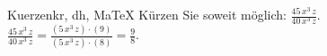 \begin{MAufgabe}{Kuerzen}{kr, dh, MaTeX}
K\"urzen Sie soweit m\"oglich: $\frac{45\, x^3\, z}{40\, x^3\, z}$.\\ 
\ifLsg\MLoesung
\quad $\frac{45\, x^3\, z}{40\, x^3\, z}=\frac{(5\, x^3\, z)\cdot(9)}{(5\, x^3\, z)\cdot(8)}=\frac{9}{8}$.\else\relax\fi
 \end{MAufgabe}